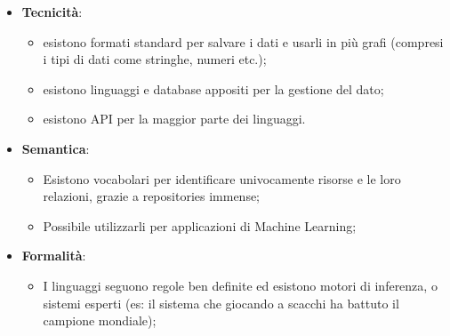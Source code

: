 \begin{itemize}
	\item \textbf{Tecnicità}:
	\begin{itemize}
		\item esistono formati standard per salvare i dati e usarli in più grafi (compresi i tipi di dati come stringhe, numeri etc.);
		\item esistono linguaggi e database appositi per la gestione del dato;
		\item esistono API per la maggior parte dei linguaggi.
	\end{itemize}
	\item \textbf{Semantica}:
	\begin{itemize}
		\item Esistono vocabolari per identificare univocamente risorse e le loro relazioni, grazie a repositories immense; 
		\item Possibile utilizzarli per applicazioni di Machine Learning;
	\end{itemize}
	\item \textbf{Formalità}:
	\begin{itemize}
		\item I linguaggi seguono regole ben definite ed esistono motori di inferenza, o sistemi esperti (es: il sistema che giocando a scacchi ha battuto il campione mondiale);
	\end{itemize}
\end{itemize}
\newpage
